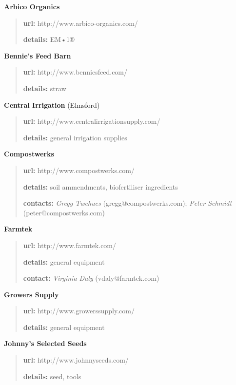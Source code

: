 \textbf{Arbico Organics}

\begin{quote}
\textbf{url:} http://www.arbico-organics.com/

\textbf{details:} EM•1®
\end{quote}

\textbf{Bennie's Feed Barn}

\begin{quote}
\textbf{url:} http://www.benniesfeed.com/

\textbf{details:} straw
\end{quote}

\textbf{Central Irrigation} (Elmsford)

\begin{quote}
\textbf{url:} http://www.centralirrigationsupply.com/

\textbf{details:} general irrigation supplies
\end{quote}

\textbf{Compostwerks}

\begin{quote}
\textbf{url:} http://www.compostwerks.com/

\textbf{details:} soil ammendments, biofertiliser ingredients

\textbf{contacts:} \emph{Gregg Twehues} (gregg@compostwerks.com);
\emph{Peter Schmidt} (peter@compostwerks.com)
\end{quote}

\textbf{Farmtek}

\begin{quote}
\textbf{url:} http://www.farmtek.com/

\textbf{details:} general equipment

\textbf{contact:} \emph{Virginia Daly} (vdaly@farmtek.com)
\end{quote}

\textbf{Growers Supply}

\begin{quote}
\textbf{url:} http://www.growerssupply.com/

\textbf{details:} general equipment
\end{quote}

\textbf{Johnny's Selected Seeds}

\begin{quote}
\textbf{url:} http://www.johnnyseeds.com/

\textbf{details:} seed, tools
\end{quote}

